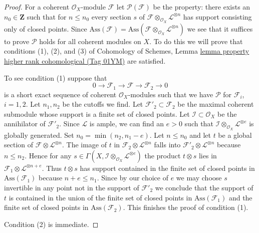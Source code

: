 \documentclass{amsart}
\theoremstyle{plain}
\theoremstyle{definition}
\theoremstyle{remark}
\numberwithin{equation}{subsection}
\begin{document}
\begin{proof}
For a coherent $\mathcal{O}_X$-module $\mathcal{F}$
let $\mathcal{P}(\mathcal{F})$ be the property: there
exists an $n_0 \in \mathbf{Z}$ such that for $n \leq n_0$
every section $s$ of
$\mathcal{F} \otimes_{\mathcal{O}_X} \mathcal{L}^{\otimes n}$
has support consisting only of closed points.
Since $\text{Ass}(\mathcal{F}) =
\text{Ass}(\mathcal{F} \otimes_{\mathcal{O}_X} \mathcal{L}^{\otimes n})$
we see that it suffices to prove $\mathcal{P}$
holds for all coherent modules on $X$.
To do this we will prove that conditions (1), (2), and (3) of
Cohomology of Schemes, Lemma
\href{https://stacks.math.columbia.edu/tag/01YM}{lemma property higher rank cohomological (Tag 01YM)}
are satisfied.

\medskip\noindent
To see condition (1) suppose that
$$
0 \to \mathcal{F}_1 \to \mathcal{F} \to \mathcal{F}_2 \to 0
$$
is a short exact sequence of coherent $\mathcal{O}_X$-modules
such that we have $\mathcal{P}$ for $\mathcal{F}_i$, $i = 1, 2$.
Let $n_1, n_2$ be the cutoffs we find.
Let $\mathcal{F}'_2 \subset \mathcal{F}_2$ be the maximal
coherent submodule whose support is a finite set of closed
points. Let $\mathcal{I} \subset \mathcal{O}_X$ be the annihilator
of $\mathcal{F}'_2$. Since $\mathcal{L}$ is ample, we can find an $e > 0$
such that $\mathcal{I} \otimes_{\mathcal{O}_X} \mathcal{L}^{\otimes e}$
is globally generated. Set $n_0 = \min(n_2, n_1 - e)$. Let $n \leq n_0$
and let $t$ be a global section of
$\mathcal{F} \otimes \mathcal{L}^{\otimes n}$.
The image of $t$ in $\mathcal{F}_2 \otimes \mathcal{L}^{\otimes n}$
falls into $\mathcal{F}'_2 \otimes \mathcal{L}^{\otimes n}$ because
$n \leq n_2$. Hence for any
$s \in \Gamma(X, \mathcal{I} \otimes_{\mathcal{O}_X} \mathcal{L}^{\otimes e})$
the product $t \otimes s$ lies in
$\mathcal{F}_1 \otimes \mathcal{L}^{\otimes n + e}$.
Thus $t \otimes s$ has support contained in
the finite set of closed points in $\text{Ass}(\mathcal{F}_1)$
because $n + e \leq n_1$. Since by our choice of $e$
we may choose $s$ invertible in any point
not in the support of $\mathcal{F}'_2$
we conclude that the support of $t$ is contained in the union of the 
finite set of closed points in $\text{Ass}(\mathcal{F}_1)$ and
the finite set of closed points in $\text{Ass}(\mathcal{F}_2)$.
This finishes the proof of condition (1).

\medskip\noindent
Condition (2) is immediate.


\end{proof}
\end{document}
